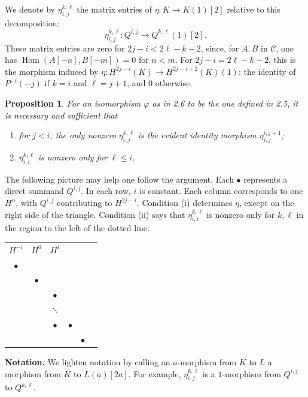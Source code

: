 \documentclass[11pt,a4paper]{article}
\theoremstyle{plain}
\newtheorem{proposition}[theorem]{Proposition}
\theoremstyle{definition}
\theoremstyle{remark}
\DeclareMathOperator{\Hom}{Hom}
\newcommand{\cC}{\mathscr{C}}
\begin{document}
We denote by $\eta^{k,\ell}_{i,j}$ the matrix entries of $\eta\colon K\to K(1)[2]$ relative to this decomposition:
\[
\eta^{k,\ell}_{i,j}\colon Q^{i,j}\to Q^{k,\ell}(1)[2].
\]
These matrix entries are zero for $2j-i<2\ell-k-2$, since, for $A,B$ in $\cC$, one has $\Hom(A[-n],B[-m])=0$ for $n<m$. For $2j-i=2\ell-k-2$, this is the morphism induced by $\eta\colon H^{2j-i}(K)\to H^{2j-i+2}(K)(1)$: the identity of $P^{-i}(-j)$ if $k=i$ and $\ell=j+1$, and $0$ otherwise.

\begin{proposition}\label{prop:2.7}
For an isomorphism $\varphi$ as in 2.6 to be the one defined in 2.5, it is necessary and sufficient that
\begin{enumerate}[label=\textup{(\roman*)}]
\item for $j<i$, the only nonzero $\eta^{k,\ell}_{i,j}$ is the evident identity morphism $\eta^{i,j+1}_{i,j}$;
\item $\eta^{k,\ell}_{i,i}$ is nonzero only for $\ell\leqslant i$.
\end{enumerate}
\end{proposition}

The following picture may help one follow the argument. Each $\bullet$ represents a direct summand $Q^{i,j}$. In each row, $i$ is constant. Each column corresponds to one $H^n$, with $Q^{i,j}$ contributing to $H^{2j-i}$. Condition (i) determines $\eta$, except on the right side of the triangle. Condition (ii) says that $\eta^{k,\ell}_{i,i}$ is nonzero only for $k,\ell$ in the region to the left of the dotted line.

\begin{center}
\begin{tabular}{cccccc}
$H^{-i}$ & $H^0$ & $H^i$ & & & \\[4pt]
$\bullet$ & & & & & \\[-2pt]
& $\bullet$ & & & & \\[-2pt]
& & $\bullet$ & & & \\[-2pt]
& & $\ddots$ & & & \\[-2pt]
& & $\bullet$ & $\bullet$ & & \\[-2pt]
& & & & $\bullet$ &
\end{tabular}
\end{center}

\medskip
\noindent\textbf{Notation.} We lighten notation by calling an $a$-morphism from $K$ to $L$ a morphism from $K$ to $L(a)[2a]$. For example, $\eta^{k,\ell}_{i,j}$ is a $1$-morphism from $Q^{i,j}$ to $Q^{k,\ell}$.
\end{document}
